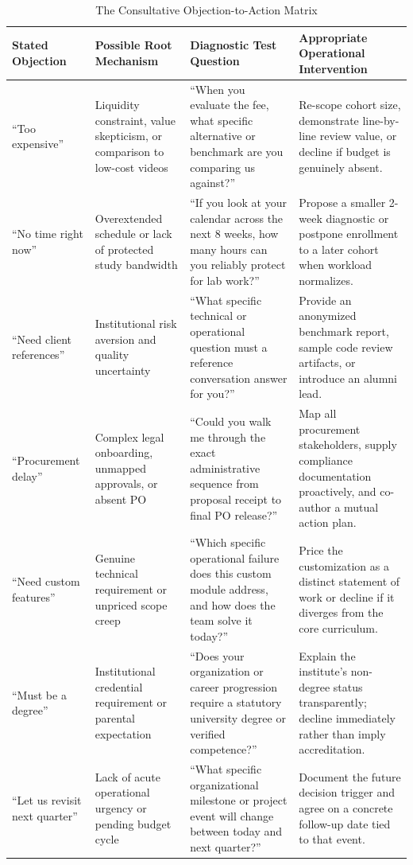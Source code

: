\begin{table}[t]
\centering
\small
\caption{The Consultative Objection-to-Action Matrix}
\label{tab:objection_matrix}
\vspace{4pt}
\begin{tabular}{p{2.6cm}p{4.2cm}p{4.2cm}p{4.4cm}}
\hline
\textbf{Stated Objection} & \textbf{Possible Root Mechanism} & \textbf{Diagnostic Test Question} & \textbf{Appropriate Operational Intervention} \\
\hline
``Too expensive'' & Liquidity constraint, value skepticism, or comparison to low-cost videos & ``When you evaluate the fee, what specific alternative or benchmark are you comparing us against?'' & Re-scope cohort size, demonstrate line-by-line review value, or decline if budget is genuinely absent. \\
\hline
``No time right now'' & Overextended schedule or lack of protected study bandwidth & ``If you look at your calendar across the next 8 weeks, how many hours can you reliably protect for lab work?'' & Propose a smaller 2-week diagnostic or postpone enrollment to a later cohort when workload normalizes. \\
\hline
``Need client references'' & Institutional risk aversion and quality uncertainty & ``What specific technical or operational question must a reference conversation answer for you?'' & Provide an anonymized benchmark report, sample code review artifacts, or introduce an alumni lead. \\
\hline
``Procurement delay'' & Complex legal onboarding, unmapped approvals, or absent PO & ``Could you walk me through the exact administrative sequence from proposal receipt to final PO release?'' & Map all procurement stakeholders, supply compliance documentation proactively, and co-author a mutual action plan. \\
\hline
``Need custom features'' & Genuine technical requirement or unpriced scope creep & ``Which specific operational failure does this custom module address, and how does the team solve it today?'' & Price the customization as a distinct statement of work or decline if it diverges from the core curriculum. \\
\hline
``Must be a degree'' & Institutional credential requirement or parental expectation & ``Does your organization or career progression require a statutory university degree or verified competence?'' & Explain the institute's non-degree status transparently; decline immediately rather than imply accreditation. \\
\hline
``Let us revisit next quarter'' & Lack of acute operational urgency or pending budget cycle & ``What specific organizational milestone or project event will change between today and next quarter?'' & Document the future decision trigger and agree on a concrete follow-up date tied to that event. \\
\hline
\end{tabular}
\end{table}

